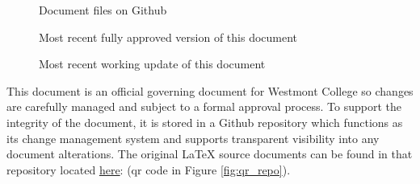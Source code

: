 \documentclass[letterpaper, 11pt]{article}
\begin{document}
	\begin{figure}
		\centering
		\vspace{-30pt}
		\caption{Document files on Github}
		\label{fig:qr_repo}
		\vspace{10pt}
		\caption{Most recent fully approved version of this document}
		\label{fig:qr_approved}
		\vspace{10pt}
		\caption{Most recent working update of this document}
		\label{fig:qr_working}
	\end{figure}


	This document is an official governing document for Westmont College so changes are carefully managed and subject to a formal approval process.
	To support the integrity of the document, it is stored in a Github repository which functions as its change management system and supports transparent visibility into any document alterations.
	The original LaTeX source documents can be found in that repository located \href{https://github.com/djp3/WestmontFacultyHandbook}{here}:	(qr code in Figure \ref{fig:qr_repo}).
\end{document}
